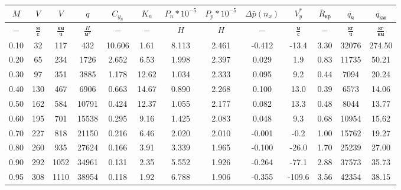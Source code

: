 \begin{tabular}{|c|c|c|c|c|c|c|c|c|c|c|c|c|}
\hline
$M$ & $V$ & $V$ & $q$ & $C_{y_n}$ & $K_n$ & $P_n*10^{-5}$ & $P_p*10^{-5}$ & $\Delta \bar{p}(n_x)$ & $V_y^*$ & $\bar{R}_{кр}$ & $q_{ч}$ & $q_{км}$ \\ 
\hline
$-$ & $\frac{м}{с}$ & $\frac{км}{ч}$ & $\frac{H}{м^2}$ & $-$ & $-$ & $H$ & $H$ & $-$ & $\frac{м}{с}$ & $-$ & $\frac{кг}{ч}$ & $\frac{кг}{км}$ \\ 
\hline
0.10 & 32 & 117 & 432 & 10.606 & 1.61 & 8.113 & 2.461 & -0.412 & -13.4 & 3.30 & 32076 & 274.50 \\ 
\hline
0.20 & 65 & 234 & 1726 & 2.652 & 6.53 & 1.998 & 2.397 & 0.029 & 1.9 & 0.83 & 11735 & 50.21 \\ 
\hline
0.30 & 97 & 351 & 3885 & 1.178 & 12.62 & 1.034 & 2.333 & 0.095 & 9.2 & 0.44 & 7094 & 20.24 \\ 
\hline
0.40 & 130 & 467 & 6906 & 0.663 & 14.67 & 0.890 & 2.268 & 0.100 & 13.0 & 0.39 & 6573 & 14.06 \\ 
\hline
0.50 & 162 & 584 & 10791 & 0.424 & 12.37 & 1.055 & 2.177 & 0.082 & 13.3 & 0.48 & 8044 & 13.77 \\ 
\hline
0.60 & 195 & 701 & 15538 & 0.295 & 9.16 & 1.425 & 2.083 & 0.048 & 9.3 & 0.68 & 10954 & 15.62 \\ 
\hline
0.70 & 227 & 818 & 21150 & 0.216 & 6.46 & 2.020 & 2.010 & -0.001 & -0.2 & 1.00 & 15762 & 19.27 \\ 
\hline
0.80 & 260 & 935 & 27624 & 0.166 & 3.91 & 3.339 & 1.965 & -0.100 & -26.0 & 1.70 & 25239 & 27.00 \\ 
\hline
0.90 & 292 & 1052 & 34961 & 0.131 & 2.35 & 5.552 & 1.926 & -0.264 & -77.1 & 2.88 & 37573 & 35.73 \\ 
\hline
0.95 & 308 & 1110 & 38954 & 0.118 & 1.92 & 6.788 & 1.906 & -0.355 & -109.6 & 3.56 & 42354 & 38.15 \\ 
\hline
\end{tabular}